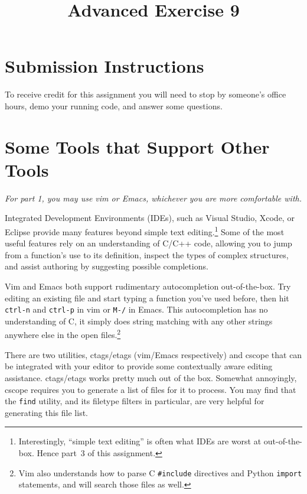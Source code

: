 \documentclass{article}
\begin{document}
\fancyfoot[C]{\color{gray} \thepage~/~\pageref*{LastPage}}
\pagestyle{fancyplain}


\title{\textbf{Advanced Exercise 9}}
\author{\textbf{\color{red}{Due: Saturday, November 19, 10:00PM (Hard Deadline)}}}
\date{}
\maketitle


\section*{Submission Instructions}
To receive credit for this assignment you will need to stop by someone's
office hours, demo your running code, and answer some questions.

\medskip
\noindent
\section{Some Tools that Support Other Tools}
\emph{For part 1, you may use vim or Emacs, whichever you are more comfortable
  with.}

Integrated Development Environments (IDEs), such as Visual Studio, Xcode, or
Eclipse provide many features beyond simple text editing.\footnote{
  Interestingly, ``simple text editing'' is often what IDEs are worst at
  out-of-the-box. Hence part~3 of this assignment.
}
Some of the most useful features rely on an understanding of C/C++ code,
allowing you to jump from a function's use to its definition, inspect the types
of complex structures, and assist authoring by suggesting possible
completions.

Vim and Emacs both support rudimentary autocompletion out-of-the-box. Try
editing an existing file and start typing a function you've used before, then
hit \texttt{ctrl-n} and \texttt{ctrl-p} in vim or \texttt{M-/} in Emacs. This
autocompletion has no understanding of C, it simply does string matching with
any other strings anywhere else in the open files.\footnote{
  Vim also understands how to parse C \texttt{\#include} directives and Python
  \texttt{import} statements, and will search those files as well.
}

There are two utilities, ctags/etags (vim/Emacs respectively) and cscope that
can be integrated with your editor to provide some contextually aware editing
assistance.
ctags/etags works pretty much out of the box. Somewhat annoyingly, cscope
requires you to generate a list of files for it to process. You may find that
the \texttt{find} utility, and its filetype filters in particular, are very
helpful for generating this file list.
\end{document}

